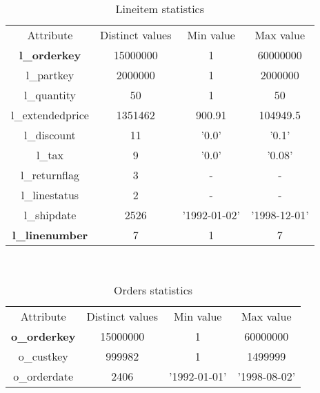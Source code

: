 \begin{table}[H]
\centering
\begin{tabular}{c|c|c|c} 
\rowcolor{blue!50} Attribute & Distinct values & Min value & Max value \\
\rowcolor{gray!10} \textbf{l\_orderkey} & 15000000 & 1 & 60000000 \\ 
\rowcolor{white} l\_partkey & 2000000 & 1 & 2000000 \\
\rowcolor{gray!10} l\_quantity & 50 & 1 & 50 \\
\rowcolor{white} l\_extendedprice & 1351462 & 900.91 & 104949.5 \\
\rowcolor{gray!10} l\_discount & 11 & '0.0' & '0.1' \\
\rowcolor{white} l\_tax & 9 & '0.0' & '0.08' \\
\rowcolor{gray!10} l\_returnflag & 3 & - & - \\
\rowcolor{white} l\_linestatus & 2 & - & - \\
\rowcolor{gray!10} l\_shipdate & 2526 & '1992-01-02' & '1998-12-01' \\
\rowcolor{white} \textbf{l\_linenumber} & 7 & 1 & 7 \\
\end{tabular}\\[0.5cm]
    \caption{Lineitem statistics}
    \label{tab:lineitem_stats}
\end{table}

\begin{table}[H]
\centering
\begin{tabular}{c|c|c|c} 
\rowcolor{blue!50} Attribute & Distinct values & Min value & Max value \\
\rowcolor{gray!10} \textbf{o\_orderkey} & 15000000 & 1 & 60000000 \\
\rowcolor{white} o\_custkey & 999982 & 1 & 1499999 \\
\rowcolor{gray!10} o\_orderdate & 2406 & '1992-01-01' & '1998-08-02' \\
\end{tabular}\\[0.5cm] 
    \caption{Orders statistics}
    \label{tab:orders_stats}
\end{table}



